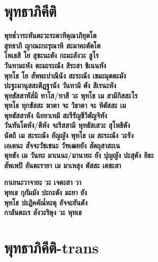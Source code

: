 \chapter{พุทธาภิคีติ}

\begin{leader}
\end{leader}

\textbf{พุทธ๎วาระหันตะวะระตาทิคุณาภิยุตโต\\
สุทธาภิ ญาณะกะรุณาหิ สะมาคะตัตโต\\
โพเธสิ โย สุชะนะตัง กะมะลังวะ สูโร\\
วันทามะหัง ตะมะระณัง สิระสา ชิเนนทัง\\
พุทโธ โย สัพพะปาณีนัง สะระณัง เขมะมุตตะมัง\\
ปะฐะมานุสสะติฏฐานัง วันทามิ ตัง สิเรนะหัง\\
พุทธัสสาหัส๎มิ ทาโส/ทาสี วะ พุทโธ เม สามิกิสสะโร\\
พุทโธ ทุกขัสสะ ฆาตา จะ วิธาตา จะ หิตัสสะ เม\\
พุทธัสสาหัง นิยยาเทมิ สะรีรัญชีวิตัญจิทัง\\
วันทันโตหัง/ตีหัง จะริสสามิ พุทธัสเสวะ สุโพธิตัง\\
นัตถิ เม สะระณัง อัญญัง พุทโธ เม สะระณัง วะรัง\\
เอเตนะ สัจจะวัชเชนะ วัฑเฒยยัง สัตถุสาสะเน\\
พุทธัง เม วันทะ มาเนนะ/มานายะ ยัง ปุญญัง ปะสุตัง อิธะ\\
สัพเพปิ อันตะรายา เม มาเหสุง ตัสสะ เตชะสา}\\

\begin{english}
\end{english}

\textbf{กาเยนะวาจายะ วะ เจตะสา วา\\
พุทเธ กุกัมมัง ปะกะตัง มะยา ยัง\\
พุทโธ ปะฏิคคัณ๎หะตุ อัจจะยันตัง\\
กาลันตะเร สังวะริตุง วะ พุทเธ}

\chapter{พุทธาภิคีติ-trans}

